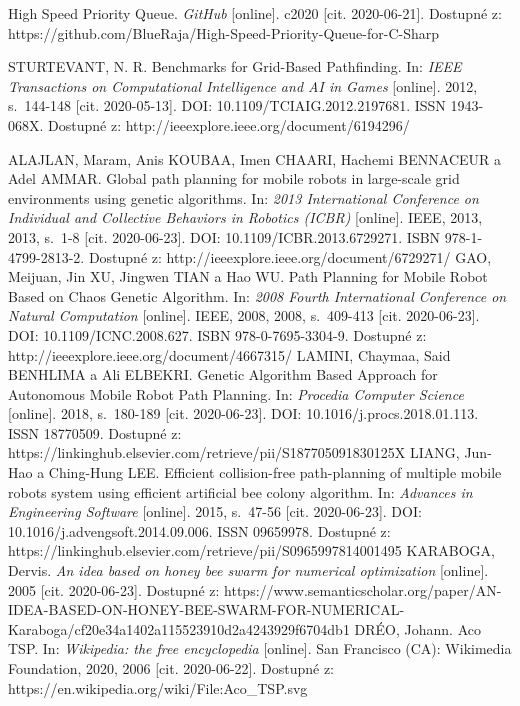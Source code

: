 \begin{thebibliography}{99}
High Speed Priority Queue. \textit{GitHub} [online]. c2020 [cit. 2020-06-21]. Dostupné z: https://github.com/BlueRaja/High-Speed-Priority-Queue-for-C-Sharp

STURTEVANT, N. R. Benchmarks for Grid-Based Pathfinding. In: \textit{IEEE Transactions on Computational Intelligence and AI in Games} [online]. 2012, s.~144-148 [cit. 2020-05-13]. DOI: 10.1109/TCIAIG.2012.2197681. ISSN 1943-068X. Dostupné z: http://ieeexplore.ieee.org/document/6194296/

ALAJLAN, Maram, Anis KOUBAA, Imen CHAARI, Hachemi BENNACEUR a Adel AMMAR. Global path planning for mobile robots in large-scale grid environments using genetic algorithms. In: \textit{2013 International Conference on Individual and Collective Behaviors in Robotics (ICBR)} [online]. IEEE, 2013, 2013, s.~1-8 [cit. 2020-06-23]. DOI: 10.1109/ICBR.2013.6729271. ISBN 978-1-4799-2813-2. Dostupné z: http://ieeexplore.ieee.org/document/6729271/
GAO, Meijuan, Jin XU, Jingwen TIAN a Hao WU. Path Planning for Mobile Robot Based on Chaos Genetic Algorithm. In: \textit{2008 Fourth International Conference on Natural Computation} [online]. IEEE, 2008, 2008, s.~409-413 [cit. 2020-06-23]. DOI: 10.1109/ICNC.2008.627. ISBN 978-0-7695-3304-9. Dostupné z: http://ieeexplore.ieee.org/document/4667315/
LAMINI, Chaymaa, Said BENHLIMA a Ali ELBEKRI. Genetic Algorithm Based Approach for Autonomous Mobile Robot Path Planning. In: \textit{Procedia Computer Science} [online]. 2018, s.~180-189 [cit. 2020-06-23]. DOI: 10.1016/j.procs.2018.01.113. ISSN 18770509. Dostupné z: https://linkinghub.elsevier.com/retrieve/pii/S187705091830125X
LIANG, Jun-Hao a Ching-Hung LEE. Efficient collision-free path-planning of multiple mobile robots system using efficient artificial bee colony algorithm. In: \textit{Advances in Engineering Software} [online]. 2015, s.~47-56 [cit. 2020-06-23]. DOI: 10.1016/j.advengsoft.2014.09.006. ISSN 09659978. Dostupné z: https://linkinghub.elsevier.com/retrieve/pii/S0965997814001495
KARABOGA, Dervis. \textit{An idea based on honey bee swarm for numerical optimization} [online]. 2005 [cit. 2020-06-23]. Dostupné z: https://www.semanticscholar.org/paper/AN-IDEA-BASED-ON-HONEY-BEE-SWARM-FOR-NUMERICAL-Karaboga/cf20e34a1402a115523910d2a4243929f6704db1
DRÉO, Johann. Aco TSP. In: \textit{Wikipedia: the free encyclopedia} [online]. San Francisco (CA): Wikimedia Foundation, 2020, 2006 [cit. 2020-06-22]. Dostupné z: https://en.wikipedia.org/wiki/File:Aco\_TSP.svg

\end{thebibliography}
